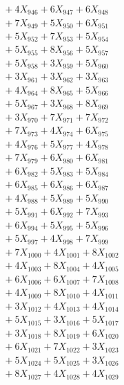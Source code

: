\documentclass[a4paper,10pt]{article}
\begin{document}
{\begin{align}
&\;  + 4 X_{946} + 6 X_{947} + 6 X_{948} \\[0.3ex]
&\;  + 7 X_{949} + 5 X_{950} + 6 X_{951} \\[0.3ex]
&\;  + 5 X_{952} + 7 X_{953} + 5 X_{954} \\[0.3ex]
&\;  + 5 X_{955} + 8 X_{956} + 5 X_{957} \\[0.3ex]
&\;  + 5 X_{958} + 3 X_{959} + 5 X_{960} \\[0.3ex]
&\;  + 3 X_{961} + 3 X_{962} + 3 X_{963} \\[0.3ex]
&\;  + 4 X_{964} + 8 X_{965} + 5 X_{966} \\[0.3ex]
&\;  + 5 X_{967} + 3 X_{968} + 8 X_{969} \\[0.5ex]\allowbreak
&\;  + 3 X_{970} + 7 X_{971} + 7 X_{972} \\[0.3ex]
&\;  + 7 X_{973} + 4 X_{974} + 6 X_{975} \\[0.3ex]
&\;  + 4 X_{976} + 5 X_{977} + 4 X_{978} \\[0.3ex]
&\;  + 7 X_{979} + 6 X_{980} + 6 X_{981} \\[0.3ex]
&\;  + 6 X_{982} + 5 X_{983} + 5 X_{984} \\[0.3ex]
&\;  + 6 X_{985} + 6 X_{986} + 6 X_{987} \\[0.3ex]
&\;  + 4 X_{988} + 5 X_{989} + 5 X_{990} \\[0.3ex]
&\;  + 5 X_{991} + 6 X_{992} + 7 X_{993} \\[0.3ex]
&\;  + 6 X_{994} + 5 X_{995} + 5 X_{996} \\[0.3ex]
&\;  + 5 X_{997} + 4 X_{998} + 7 X_{999} \\[0.5ex]\allowbreak
&\;  + 7 X_{1000} + 4 X_{1001} + 8 X_{1002} \\[0.3ex]
&\;  + 4 X_{1003} + 8 X_{1004} + 4 X_{1005} \\[0.3ex]
&\;  + 6 X_{1006} + 6 X_{1007} + 7 X_{1008} \\[0.3ex]
&\;  + 4 X_{1009} + 8 X_{1010} + 4 X_{1011} \\[0.3ex]
&\;  + 3 X_{1012} + 4 X_{1013} + 4 X_{1014} \\[0.3ex]
&\;  + 5 X_{1015} + 3 X_{1016} + 5 X_{1017} \\[0.3ex]
&\;  + 3 X_{1018} + 8 X_{1019} + 6 X_{1020} \\[0.3ex]
&\;  + 6 X_{1021} + 7 X_{1022} + 3 X_{1023} \\[0.3ex]
&\;  + 5 X_{1024} + 5 X_{1025} + 3 X_{1026} \\[0.3ex]
&\;  + 8 X_{1027} + 4 X_{1028} + 4 X_{1029} \\[0.5ex]\allowbreak

\end{align}}
\end{document}
